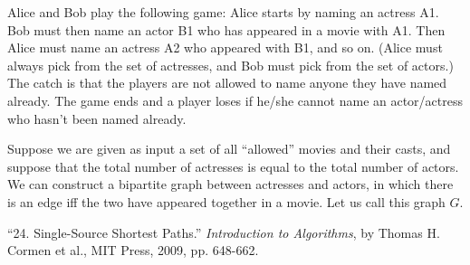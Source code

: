 \documentclass[addpoints]{exam}
\begin{document}
\begin{questions}

Alice and Bob play the following game: Alice starts by naming an actress A1. Bob must then name an actor B1 who has appeared in a movie with A1. Then Alice must name an actress A2 who appeared with B1, and so on. (Alice must always pick from the set of actresses, and Bob must pick from the set of actors.) The catch is that the players are not allowed to name anyone they have named already. The game ends and a player loses if he/she cannot name an actor/actress who hasn't been named already.

Suppose we are given as input a set of all ``allowed'' movies and their casts, and suppose that the total number of actresses is equal to the total number of actors. We can construct a bipartite graph between actresses and actors, in which there is an edge iff the two have appeared together in a movie. Let us call this graph $G$.  


\end{questions}

\begin{thebibliography}{9}

 \enquote{24. Single-Source Shortest Paths.} \textit{Introduction to Algorithms}, by Thomas H. Cormen et al., MIT Press, 2009, pp. 648-662.

\end{thebibliography}
\end{document}
